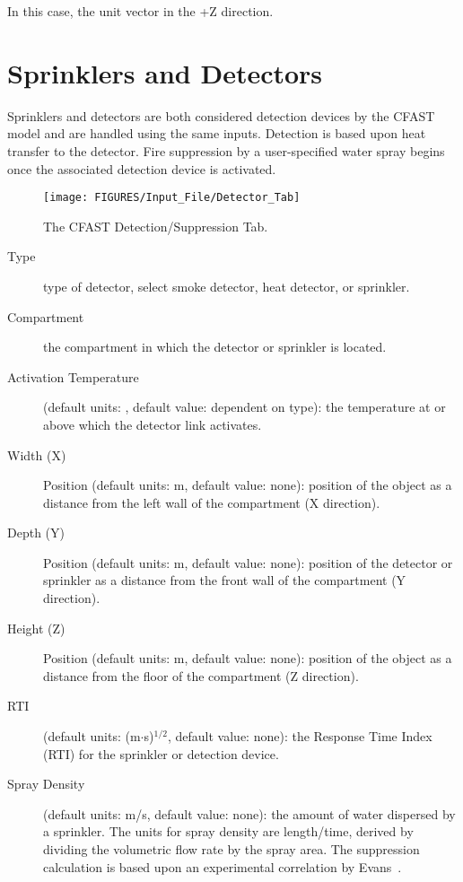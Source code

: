 In this case, the unit vector in the +Z direction.





\chapter{Sprinklers and Detectors}

Sprinklers and detectors are both considered detection devices by the CFAST model and are handled using the same inputs.  Detection is based upon heat transfer to the detector. Fire suppression by a user-specified water spray begins once the associated detection device is activated.

\begin{figure}[h!]
\begin{center}
\texttt{[image: FIGURES/Input\_File/Detector\_Tab]}
\caption[The CFAST Detection/Suppression Tab]{The CFAST Detection/Suppression Tab.}
\end{center}
\end{figure}

\begin{description}
\item[Type] type of detector, select smoke detector, heat detector, or sprinkler.

\item[Compartment] the compartment in which the detector or sprinkler is located.

\item[Activation Temperature] (default units: \degc, default value: dependent on type): the temperature at or above which the detector link activates.

\item[Width (X)] Position (default units: m, default value: none): position of the object as a distance from the left wall of the compartment (X direction).

\item[Depth (Y)] Position (default units: m, default value: none): position of the detector or sprinkler as a distance from the front wall of the compartment (Y direction).

\item[Height (Z)] Position (default units: m, default value: none): position of the object as a distance from the floor of the compartment (Z direction).

\item[RTI] (default units: (m$\cdot$s)$^{1/2}$, default value: none): the Response Time Index (RTI) for the sprinkler or detection device.

\item[Spray Density] (default units: m/s, default value: none): the amount of water dispersed by a sprinkler.  The units for spray density are length/time, derived by dividing the volumetric flow rate by the spray area. The suppression calculation is based upon an experimental correlation by Evans~\cite{Evans:1993}.
\end{description}

